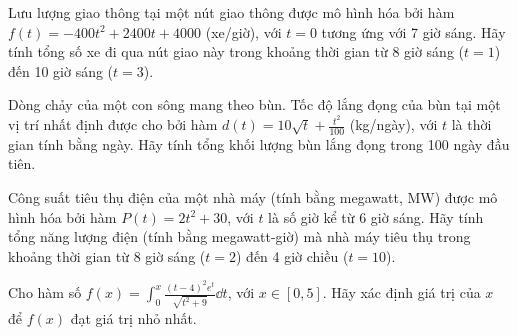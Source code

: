 \begin{exercise}
    Lưu lượng giao thông tại một nút giao thông được mô hình hóa bởi hàm $f(t) = -400t^2 + 2400t + 4000$ (xe/giờ), với $t=0$ tương ứng với 7 giờ sáng. Hãy tính tổng số xe đi qua nút giao này trong khoảng thời gian từ 8 giờ sáng ($t=1$) đến 10 giờ sáng ($t=3$).
\end{exercise}

\begin{exercise}
    Dòng chảy của một con sông mang theo bùn. Tốc độ lắng đọng của bùn tại một vị trí nhất định được cho bởi hàm $d(t) = 10 \sqrt{t} + \frac{t^2}{100}$ (kg/ngày), với $t$ là thời gian tính bằng ngày. Hãy tính tổng khối lượng bùn lắng đọng trong 100 ngày đầu tiên.
\end{exercise}

\begin{exercise}
    Công suất tiêu thụ điện của một nhà máy (tính bằng megawatt, MW) được mô hình hóa bởi hàm $P(t) = 2t^2 + 30$, với $t$ là số giờ kể từ 6 giờ sáng. Hãy tính tổng năng lượng điện (tính bằng megawatt-giờ) mà nhà máy tiêu thụ trong khoảng thời gian từ 8 giờ sáng ($t=2$) đến 4 giờ chiều ($t=10$).
\end{exercise}

\begin{exercise}
    Cho hàm số $f(x) = \int_{0}^{x} \frac{(t-4)^2 e^t}{\sqrt{t^2+9}} \dd t$, với $x \in [0, 5]$. Hãy xác định giá trị của $x$ để $f(x)$ đạt giá trị nhỏ nhất.
\end{exercise}
